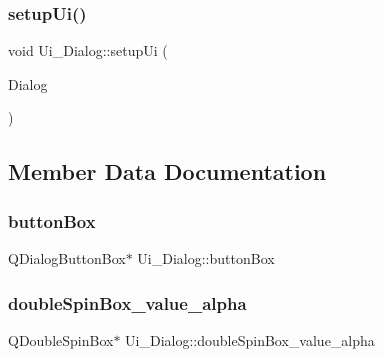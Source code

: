 \hypertarget{class_ui___dialog_a4f6a478c3ecdafabffb17b39cb26444a}{}\label{class_ui___dialog_a4f6a478c3ecdafabffb17b39cb26444a} 
\subsubsection{\texorpdfstring{setup\+Ui()}{setupUi()}}
{\footnotesize\ttfamily void Ui\+\_\+\+Dialog\+::setup\+Ui (\begin{DoxyParamCaption}\item[{Q\+Dialog $\ast$}]{Dialog }\end{DoxyParamCaption})\hspace{0.3cm}{\ttfamily [inline]}}



\subsection{Member Data Documentation}
\hypertarget{class_ui___dialog_a271a59402f80983c2722bb455db37365}{}\label{class_ui___dialog_a271a59402f80983c2722bb455db37365} 
\subsubsection{\texorpdfstring{button\+Box}{buttonBox}}
{\footnotesize\ttfamily Q\+Dialog\+Button\+Box$\ast$ Ui\+\_\+\+Dialog\+::button\+Box}

\hypertarget{class_ui___dialog_a45223f3641a2da220e880eba8c7ae100}{}\label{class_ui___dialog_a45223f3641a2da220e880eba8c7ae100} 
\subsubsection{\texorpdfstring{double\+Spin\+Box\+\_\+value\+\_\+alpha}{doubleSpinBox\_value\_alpha}}
{\footnotesize\ttfamily Q\+Double\+Spin\+Box$\ast$ Ui\+\_\+\+Dialog\+::double\+Spin\+Box\+\_\+value\+\_\+alpha}

\hypertarget{class_ui___dialog_acb6d62af6a65734d26b419c39fac30bd}{}\label{class_ui___dialog_acb6d62af6a65734d26b419c39fac30bd} 
